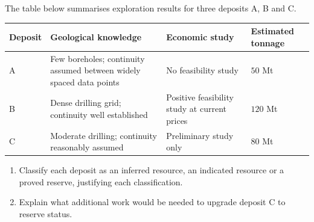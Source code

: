 \documentclass[11pt]{article}
\newcommand{\cle}[1]{{\popxbold\color{popdark}#1}}
\begin{document}
\begin{exercice}
The table below summarises exploration results for three deposits A, B and C.

\begin{center}
\begin{tabularx}{\linewidth}{|l|X|X|X|}
\hline
\rowcolor{popblueL} \textbf{Deposit} & \textbf{Geological knowledge} & \textbf{Economic study} & \textbf{Estimated tonnage} \\
\hline
A & Few boreholes; continuity assumed between widely spaced data points & No feasibility study & $50$ Mt \\
\hline
B & Dense drilling grid; continuity well established & Positive feasibility study at current prices & $120$ Mt \\
\hline
C & Moderate drilling; continuity reasonably assumed & Preliminary study only & $80$ Mt \\
\hline
\end{tabularx}
\end{center}

\begin{enumerate}
\item Classify each deposit as an \cle{inferred resource}, an \cle{indicated resource} or a \cle{proved reserve}, justifying each classification.
\item Explain what additional work would be needed to upgrade deposit C to reserve status.
\end{enumerate}
\end{exercice}
\end{document}
